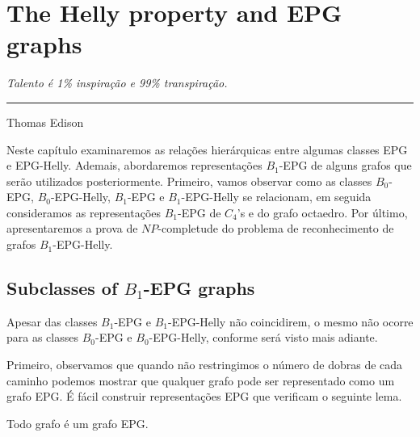 \chapter{The Helly property and EPG graphs}\label{cap:capiii}

\begin{flushright}
\begin{minipage}[t][0cm][b]{0.47\textwidth}
\emph{
Talento é 1\% inspiração e 99\% transpiração. }
\end{minipage}

\rule[0cm]{7cm}{0.03cm}%

Thomas Edison
\end{flushright}

Neste capítulo examinaremos as relações hierárquicas entre algumas classes EPG e EPG-Helly. Ademais, abordaremos representações $B_1$-EPG de alguns grafos que serão utilizados posteriormente. Primeiro, vamos observar como as classes $B_0$-EPG, $B_0$-EPG-Helly, $B_1$-EPG e $B_1$-EPG-Helly se relacionam, em seguida consideramos as representações $B_1$-EPG de $C_4$'s e do grafo octaedro. Por último, apresentaremos a prova de $NP$-completude do problema de reconhecimento de grafos $B_1$-EPG-Helly.


\section{Subclasses of $B_1$-EPG graphs}

Apesar das classes $B_1$-EPG e $ B_1$-EPG-Helly não coincidirem,  o mesmo não ocorre para as classes $ B_0$-EPG e $ B_0$-EPG-Helly, conforme será visto mais adiante.

Primeiro, observamos que quando não restringimos o número de dobras de cada caminho podemos mostrar que qualquer grafo pode ser representado como um grafo EPG.
É fácil construir representações EPG que verificam o seguinte lema. 

 
 
 \begin{lema} \cite{golumbic2009} \label{lem:todoGrafoEpg}
 Todo grafo é um grafo EPG.
 \end{lema}
 
